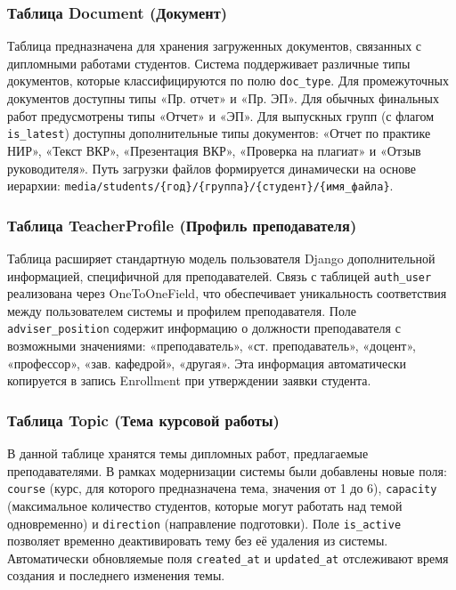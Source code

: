 \documentclass[a4paper,12pt]{article}
\begin{document}
\subsubsection{Таблица Document (Документ)}

Таблица предназначена для хранения загруженных документов, связанных с дипломными работами студентов. Система поддерживает различные типы документов, которые классифицируются по полю \texttt{doc\_type}. Для промежуточных документов доступны типы «Пр. отчет» и «Пр. ЭП». Для обычных финальных работ предусмотрены типы «Отчет» и «ЭП». Для выпускных групп (с флагом \texttt{is\_latest}) доступны дополнительные типы документов: «Отчет по практике НИР», «Текст ВКР», «Презентация ВКР», «Проверка на плагиат» и «Отзыв руководителя». Путь загрузки файлов формируется динамически на основе иерархии: \texttt{media/students/\{год\}/\{группа\}/\{студент\}/\{имя\_файла\}}.

\subsubsection{Таблица TeacherProfile (Профиль преподавателя)}

Таблица расширяет стандартную модель пользователя Django дополнительной информацией, специфичной для преподавателей. Связь с таблицей \texttt{auth\_user} реализована через OneToOneField, что обеспечивает уникальность соответствия между пользователем системы и профилем преподавателя. Поле \texttt{adviser\_position} содержит информацию о должности преподавателя с возможными значениями: «преподаватель», «ст. преподаватель», «доцент», «профессор», «зав. кафедрой», «другая». Эта информация автоматически копируется в запись Enrollment при утверждении заявки студента.

\subsubsection{Таблица Topic (Тема курсовой работы)}

В данной таблице хранятся темы дипломных работ, предлагаемые преподавателями. В рамках модернизации системы были добавлены новые поля: \texttt{course} (курс, для которого предназначена тема, значения от 1 до 6), \texttt{capacity} (максимальное количество студентов, которые могут работать над темой одновременно) и \texttt{direction} (направление подготовки). Поле \texttt{is\_active} позволяет временно деактивировать тему без её удаления из системы. Автоматически обновляемые поля \texttt{created\_at} и \texttt{updated\_at} отслеживают время создания и последнего изменения темы.
\end{document}
